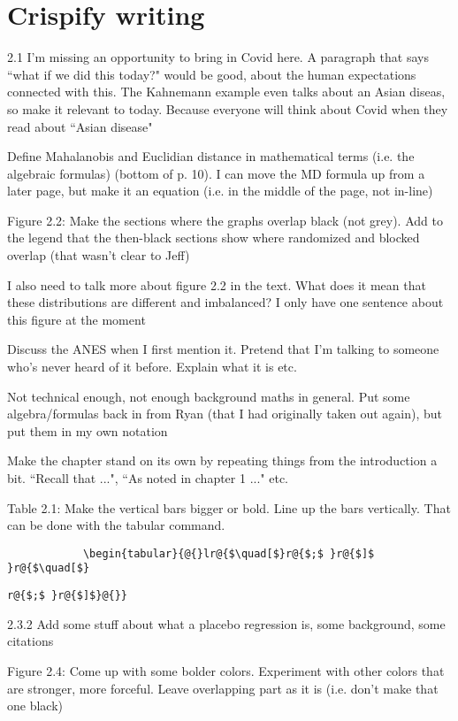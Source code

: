 \documentclass[12pt]{article}
\begin{document}
\section*{Crispify writing}
	\begin{coi}
		\item 2.1 I'm missing an opportunity to bring in Covid here. A paragraph that says ``what if we did this today?" would be good, about the human expectations connected with this. The Kahnemann example even talks about an Asian diseas, so make it relevant to today. Because everyone will think about Covid when they read about ``Asian disease"
		\item Define Mahalanobis and Euclidian distance in mathematical terms (i.e. the algebraic formulas) (bottom of p. 10). I can move the MD formula up from a later page, but make it an equation (i.e. in the middle of the page, not in-line)
		\item Figure 2.2: Make the sections where the graphs overlap black (not grey). Add to the legend that the then-black sections show where randomized and blocked overlap (that wasn't clear to Jeff)
		\item I also need to talk more about figure 2.2 in the text. What does it mean that these distributions are different and imbalanced? I only have one sentence about this figure at the moment
		\item Discuss the ANES when I first mention it. Pretend that I'm talking to someone who's never heard of it before. Explain what it is etc.
		\item Not technical enough, not enough background maths in general. Put some algebra/formulas back in from Ryan (that I had originally taken out again), but put them in my own notation
		\item Make the chapter stand on its own by repeating things from the introduction a bit. ``Recall that ...", ``As noted in chapter 1 ..." etc. 
		\item Table 2.1: Make the vertical bars bigger or bold. Line up the bars vertically. That can be done with the {tabular} command. \begin{verbatim}
			\begin{tabular}{@{}lr@{$\quad[$}r@{$;$ }r@{$]$ }r@{$\quad[$}\end{verbatim}
			\begin{verbatim}r@{$;$ }r@{$]$}@{}}\end{verbatim}
 		\item 2.3.2 Add some stuff about what a placebo regression is, some background, some citations
 		\item Figure 2.4: Come up with some bolder colors. Experiment with other colors that are stronger, more forceful. Leave overlapping part as it is (i.e. don't make that one black)
	\end{coi}
\end{document}
